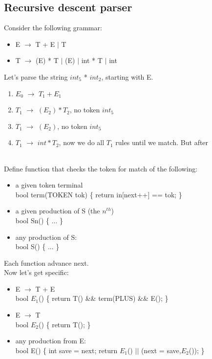 \documentclass[12pt]{article}
\begin{document}
\subsection{ Recursive descent parser}
Consider the following grammar:
\begin{itemize}
    \item E $\rightarrow$ T + E $|$ T
    \item T $\rightarrow$ (E) * T $|$ (E) $|$ int * T $|$ int
\end{itemize}
Let's parse the string $int_5$ * $int_2$, starting with E. 
\begin{enumerate}
    \item $E_0$ $\rightarrow$ $T_1 + E_1$
    \item $T_1$ $\rightarrow$ $(E_2)*T_2$, no token $int_5$
    \item $T_1$ $\rightarrow$ $(E_2)$, no token $int_5$
    \item $T_1$ $\rightarrow$ $int*T_2$, now we do all $T_1$ rules until we match. But after 
\end{enumerate}
\\ Define function that checks the token for match of the following: 
\begin{itemize}
    \item a given token terminal 
        \\ bool term(TOKEN tok) \{ return in[next++] == tok; \}
    \item a given production of S (the $n^{th}$) 
        \\ bool Sn() \{ ... \}
    \item any production of S:
        \\ bool S() \{ ... \}
\end{itemize}
Each function advance next. 
\\ Now let's get specific:
\begin{itemize}
    \item E $\rightarrow$ T + E
        \\ bool $E_1$() \{ return T() \&\& term(PLUS) \&\& E(); \}
    \item E $\rightarrow$ T
        \\ bool $E_2$() \{ return T(); \}
    \item any production from E: 
        \\ bool E() \{ 
            int save = next;
            return $E_1$() $||$ (next = save,$E_2$()); \}
\end{itemize}
\end{document}
